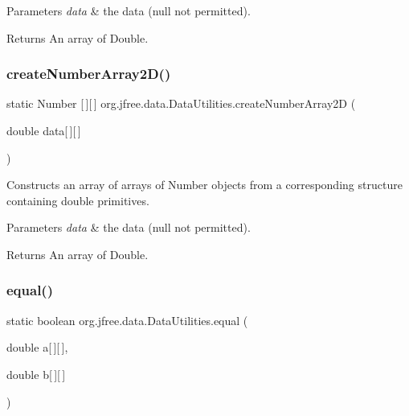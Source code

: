 \begin{DoxyParams}{Parameters}
{\em data} & the data ({\ttfamily null} not permitted).\\
\hline
\end{DoxyParams}
\begin{DoxyReturn}{Returns}
An array of {\ttfamily Double}. 
\end{DoxyReturn}
\mbox{\label{classorg_1_1jfree_1_1data_1_1_data_utilities_a6c763c2ac731dd2dc9461b7bf31d311b}} 
\subsubsection{\texorpdfstring{create\+Number\+Array2\+D()}{createNumberArray2D()}}
{\footnotesize\ttfamily static Number \mbox{[}$\,$\mbox{]}\mbox{[}$\,$\mbox{]} org.\+jfree.\+data.\+Data\+Utilities.\+create\+Number\+Array2D (\begin{DoxyParamCaption}\item[{double}]{data\mbox{[}$\,$\mbox{]}\mbox{[}$\,$\mbox{]} }\end{DoxyParamCaption})\hspace{0.3cm}{\ttfamily [static]}}

Constructs an array of arrays of {\ttfamily Number} objects from a corresponding structure containing {\ttfamily double} primitives.


\begin{DoxyParams}{Parameters}
{\em data} & the data ({\ttfamily null} not permitted).\\
\hline
\end{DoxyParams}
\begin{DoxyReturn}{Returns}
An array of {\ttfamily Double}. 
\end{DoxyReturn}
\mbox{\label{classorg_1_1jfree_1_1data_1_1_data_utilities_a56e4378a433e7f746a59e97007305d8b}} 
\subsubsection{\texorpdfstring{equal()}{equal()}}
{\footnotesize\ttfamily static boolean org.\+jfree.\+data.\+Data\+Utilities.\+equal (\begin{DoxyParamCaption}\item[{double}]{a\mbox{[}$\,$\mbox{]}\mbox{[}$\,$\mbox{]},  }\item[{double}]{b\mbox{[}$\,$\mbox{]}\mbox{[}$\,$\mbox{]} }\end{DoxyParamCaption})\hspace{0.3cm}{\ttfamily [static]}}

